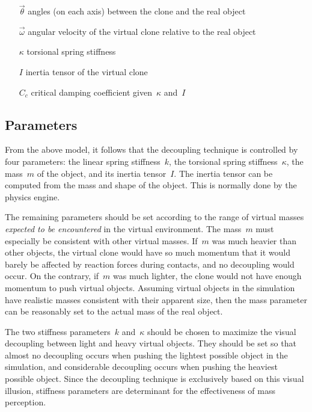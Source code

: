 \documentclass{vgtc}
\begin{document}
\vspace{-3mm}
\begin{itemize}[leftmargin=1.5em]
\item[$\vec{\theta}$] angles (on each axis) between the clone and the real object
\item[$\vec{\omega}$] angular velocity of the virtual clone relative to the real object
\item[$\kappa$] torsional spring stiffness
\item[$I$] inertia tensor of the virtual clone
\item[$C_c$] critical damping coefficient given~$\kappa$ and~$I$
\end{itemize}

\subsection{Parameters}

From the above model, it follows that the decoupling technique is controlled by four parameters: the linear spring stiffness~$k$, the torsional spring stiffness~$\kappa$, the mass~$m$ of the object, and its inertia tensor~$I$. The inertia tensor can be computed from the mass and shape of the object. This is normally done by the physics engine.

The remaining parameters should be set according to the range of virtual masses \emph{expected to be encountered} in the virtual environment. The mass~$m$ must especially be consistent with other virtual masses. If~$m$ was much heavier than other objects, the virtual clone would have so much momentum that it would barely be affected by reaction forces during contacts, and no decoupling would occur. On the contrary, if~$m$ was much lighter, the clone would not have enough momentum to push virtual objects. Assuming virtual objects in the simulation have realistic masses consistent with their apparent size, then the mass parameter can be reasonably set to the actual mass of the real object.

The two stiffness parameters~$k$ and~$\kappa$ should be chosen to maximize the visual decoupling between light and heavy virtual objects. They should be set so that almost no decoupling occurs when pushing the lightest possible object in the simulation, and considerable decoupling occurs when pushing the heaviest possible object. Since the decoupling technique is exclusively based on this visual illusion, stiffness parameters are determinant for the effectiveness of mass perception.
\end{document}
